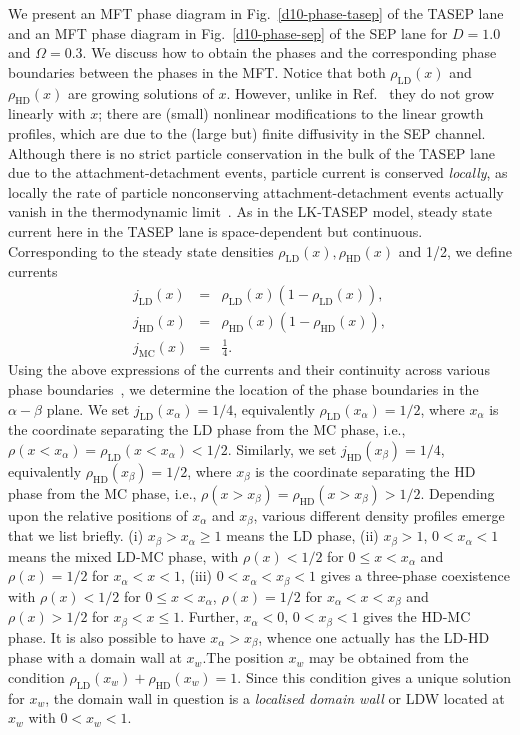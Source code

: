 \documentclass[aps,pre,twocolumn,superscriptaddress,amsmath,amssymb,longbibliography,floatfix,nofootinbib]{revtex4}
\begin{document}
{We present an MFT phase diagram in Fig.~\ref{d10-phase-tasep} of the TASEP lane and an MFT phase diagram in Fig.~\ref{d10-phase-sep} of the SEP lane for $D=1.0$ and $\Omega=0.3$. We discuss how to obtain the phases and the corresponding phase boundaries between the phases in the MFT. Notice that both $\rho_\text{LD}(x)$ and $\rho_\text{HD}(x)$ are growing solutions of $x$. However, unlike in Ref.~\cite{frey-lktasep} they do not grow linearly with $x$; there are (small) nonlinear modifications to the linear growth profiles, which are due to the (large but) finite diffusivity in the SEP channel. Although there is no strict particle conservation in the bulk of the TASEP lane due to the attachment-detachment events, particle current is conserved {\em locally}, as locally the rate of particle nonconserving attachment-detachment events actually vanish in the thermodynamic limit~\cite{frey-lktasep}. As in the LK-TASEP model, steady state current here in the TASEP lane is space-dependent but continuous. Corresponding to the steady state densities $\rho_\text{LD}(x),\rho_\text{HD}(x)$ and 1/2, we define currents
\begin{eqnarray}
 j_\text{LD}(x)&=&\rho_\text{LD}(x) (1-\rho_\text{LD}(x)),\label{curr1}\\
 j_\text{HD}(x)&=&\rho_\text{HD}(x) (1-\rho_\text{HD}(x)),\label{curr2}\\
 j_\text{MC}(x)&=&\frac{1}{4} \label{curr3}.
\end{eqnarray}
Using the above expressions of the currents and their continuity across various phase boundaries~\cite{frey-lktasep}, we determine the location of the phase boundaries in the $\alpha-\beta$ plane. We set $j_\text{LD}(x_\alpha)=1/4$, equivalently $\rho_\text{LD}(x_\alpha)=1/2$, where $x_\alpha$ is the coordinate separating the LD phase from the MC phase, i.e., $\rho (x<x_\alpha)=\rho_\text{LD}(x<x_\alpha)<1/2$. Similarly, we set $j_\text{HD}(x_\beta)=1/4$, equivalently $\rho_\text{HD}(x_\beta)=1/2$, where $x_\beta$ is the coordinate separating the HD phase from the MC phase, i.e., $\rho (x>x_\beta)=\rho_\text{HD}(x>x_\beta)>1/2$. Depending upon the relative positions of $x_\alpha$ and $x_\beta$, various different density profiles emerge that we list briefly. (i) $x_\beta>x_\alpha\geq 1$ means the LD phase, (ii) $x_\beta>1$, $0<x_\alpha<1$ means the mixed LD-MC phase, with $\rho(x)<1/2$ for $0\leq x<x_\alpha$ and $\rho(x)=1/2$ for $x_\alpha<x<1$, (iii) $0<x_\alpha<x_\beta<1$ gives a three-phase coexistence with $\rho(x)<1/2$ for $0\leq x<x_\alpha$, $\rho(x)=1/2$ for $x_\alpha<x<x_\beta$ and $\rho(x)>1/2$ for $x_\beta<x\leq 1$. Further, $x_\alpha<0$, $0<x_\beta<1$ gives the HD-MC phase. It is also possible to have $x_\alpha>x_\beta$, whence one actually has the LD-HD phase with a domain wall at $x_w$.The position $x_w$ may be obtained from the condition $\rho_\text{LD}(x_w)+\rho_\text{HD}(x_w)=1$. Since this condition gives a unique solution for $x_w$, the domain wall in question is a {\em localised domain wall} or LDW located at $x_w$ with $0<x_w<1$.





}
\end{document}
